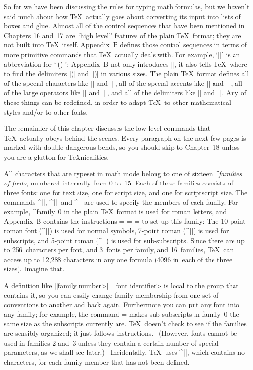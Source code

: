\danger So far we have been discussing the rules for typing math formulas,
but we haven't said much about how \TeX\ actually goes about converting
its input into lists of boxes and glue. Almost all of the control
sequences that have been mentioned in Chapters 16 and~17 are ``high level''
features of the plain \TeX\ format; they are not built into \TeX\ itself.
Appendix~B defines those control sequences in terms of more primitive
commands that \TeX\ actually deals with. For example, `|\choose|' is
an abbreviation for `|\atopwithdelims()|'; Appendix~B not only introduces
|\choose|, it also tells \TeX\ where to find the delimiters |(| and~|)|
in various sizes. The plain \TeX\ format defines all of the special
characters like |\alpha| and~|\mapsto|, all of the special accents like
|\tilde| and~|\widehat|, all of the large operators like |\sum| and~|\int|,
and all of the delimiters like |\lfloor| and~|\vert|. Any of these things
can be redefined, in order to adapt \TeX\ to other mathematical styles
and/or to other fonts.

\danger The remainder of this chapter discusses the low-level commands
that \TeX\ actually obeys behind the scenes.  Every paragraph on the next
few pages is marked with double dangerous bends, so you should skip to
Chapter~18 unless you are a glutton for \TeX nicalities.

\ninepoint
\ddanger All characters that are typeset in math mode belong to one of
sixteen {\sl^{families} of fonts}, numbered internally from 0 to~15. Each
of these families consists of three fonts: one for text size, one for
script size, and one for scriptscript size. The commands ^|\textfont|,
^|\scriptfont|, and ^|\scriptscriptfont| are used to specify the members
of each family.  For example, ^{family~0} in the plain \TeX\ format is
used for roman letters, and Appendix~B contains the instructions
\begintt
{}=\tenrm
{}=\sevenrm
{}=\fiverm
\endtt
to set up this family: The 10-point roman font (^|\tenrm|) is used for
normal symbols, 7-point roman (^|\sevenrm|) is used for subscripts, and
5-point roman (^|\fiverm|) is used for sub-subscripts. Since there are up to
256~characters per font, and 3~fonts per family, and 16~families, \TeX\ can
access up to 12,288 characters in any one formula (4096 in~each of
the three sizes). Imagine that.

\ddanger A definition like |\textfont|\<family number>|=|\<font identifier>
is local to the group that contains it, so you can easily change family
membership from one set of conventions to another and back again. Furthermore
you can put any font into any family; for example, the command
\begintt
{}=
\endtt
makes sub-subscripts in family~0 the same size as the subscripts currently
are. \TeX\ doesn't check to see if the families are sensibly organized; it
just follows instructions. \ (However, fonts cannot be used in families
2 and~3 unless they contain a certain number of special parameters, as we
shall see later.) \ Incidentally, \TeX\ uses ^|\nullfont|, which contains
no characters, for each family member that has not been defined.

